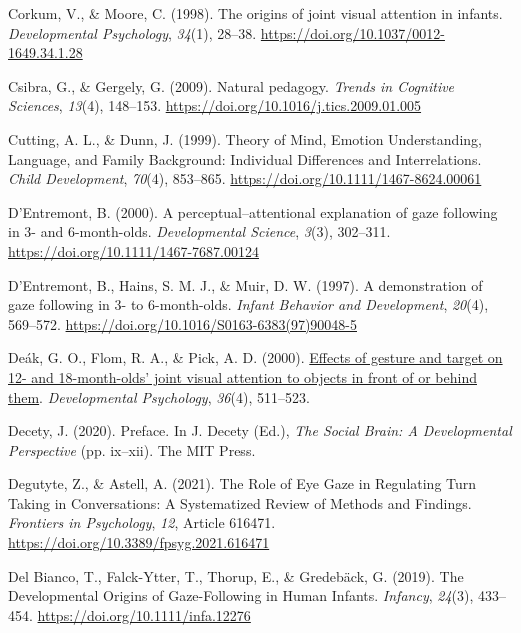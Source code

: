 \documentclass[
]{scrbook}
\newlength{\cslhangindent}
\newenvironment{CSLReferences}[2] %
 {\begin{list}{}{%
  \setlength{\itemindent}{0pt}
  \setlength{\leftmargin}{0pt}
  \setlength{\parsep}{0pt}
  \ifodd #1
   \setlength{\leftmargin}{\cslhangindent}
   \setlength{\itemindent}{-1\cslhangindent}
  \fi
  \setlength{\itemsep}{#2\baselineskip}}}
 {\end{list}}
\begin{document}
\begin{CSLReferences}{1}{0}
Corkum, V., \& Moore, C. (1998). The origins of joint visual attention in infants. \emph{Developmental Psychology}, \emph{34}(1), 28--38. \url{https://doi.org/10.1037/0012-1649.34.1.28}

Csibra, G., \& Gergely, G. (2009). Natural pedagogy. \emph{Trends in Cognitive Sciences}, \emph{13}(4), 148--153. \url{https://doi.org/10.1016/j.tics.2009.01.005}

Cutting, A. L., \& Dunn, J. (1999). Theory of {Mind}, {Emotion Understanding}, {Language}, and {Family Background}: {Individual Differences} and {Interrelations}. \emph{Child Development}, \emph{70}(4), 853--865. \url{https://doi.org/10.1111/1467-8624.00061}

D'Entremont, B. (2000). A perceptual--attentional explanation of gaze following in 3- and 6-month-olds. \emph{Developmental Science}, \emph{3}(3), 302--311. \url{https://doi.org/10.1111/1467-7687.00124}

D'Entremont, B., Hains, S. M. J., \& Muir, D. W. (1997). A demonstration of gaze following in 3- to 6-month-olds. \emph{Infant Behavior and Development}, \emph{20}(4), 569--572. \url{https://doi.org/10.1016/S0163-6383(97)90048-5}

Deák, G. O., Flom, R. A., \& Pick, A. D. (2000). \href{https://www.ncbi.nlm.nih.gov/pubmed/10902702}{Effects of gesture and target on 12- and 18-month-olds' joint visual attention to objects in front of or behind them}. \emph{Developmental Psychology}, \emph{36}(4), 511--523.

Decety, J. (2020). Preface. In J. Decety (Ed.), \emph{The {Social Brain}: {A Developmental Perspective}} (pp. ix--xii). The MIT Press.

Degutyte, Z., \& Astell, A. (2021). The {Role} of {Eye Gaze} in {Regulating Turn Taking} in {Conversations}: {A Systematized Review} of {Methods} and {Findings}. \emph{Frontiers in Psychology}, \emph{12}, Article 616471. \url{https://doi.org/10.3389/fpsyg.2021.616471}

Del Bianco, T., Falck-Ytter, T., Thorup, E., \& Gredebäck, G. (2019). The {Developmental Origins} of {Gaze-Following} in {Human Infants}. \emph{Infancy}, \emph{24}(3), 433--454. \url{https://doi.org/10.1111/infa.12276}


\end{CSLReferences}
\end{document}
